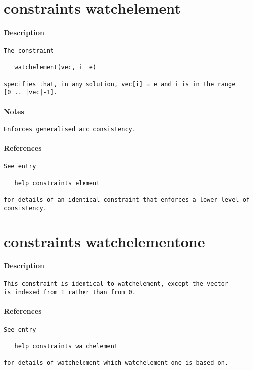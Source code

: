 \section{constraints watchelement}
\paragraph{Description}
{\footnotesize
\begin{verbatim}
The constraint 

   watchelement(vec, i, e)

specifies that, in any solution, vec[i] = e and i is in the range 
[0 .. |vec|-1].
\end{verbatim}
}
\paragraph{Notes}
{\footnotesize
\begin{verbatim}
Enforces generalised arc consistency.
\end{verbatim}
}
\paragraph{References}
{\footnotesize
\begin{verbatim}
See entry

   help constraints element

for details of an identical constraint that enforces a lower level of
consistency.
\end{verbatim}
}
\section{constraints watchelement\textunderscore one}
\paragraph{Description}
{\footnotesize
\begin{verbatim}
This constraint is identical to watchelement, except the vector
is indexed from 1 rather than from 0.
\end{verbatim}
}
\paragraph{References}
{\footnotesize
\begin{verbatim}
See entry

   help constraints watchelement

for details of watchelement which watchelement_one is based on.
\end{verbatim}
}
